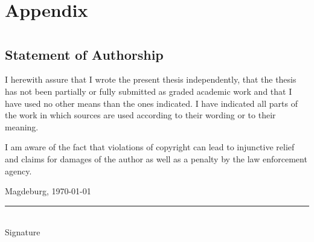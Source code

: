 \documentclass[
  12pt,
  a4paper,
  printlength,
  bibliography=totoc,
  chapterprefix,
  headings=openright,
  numbers=endperiod,
  parskip=half,
  twoside
]{scrreprt}
\begin{document}
\lipsum[2]

\printbibliography


\appendix

\chapter{Appendix}
\label{cha:appendix}

\chapter*{}

\section*{Statement of Authorship}

I herewith assure that I wrote the present thesis independently, that the thesis has not been partially or fully submitted as graded academic work and that I have used no other means than the ones indicated.
I have indicated all parts of the work in which sources are used according to their wording or to their meaning.

I am aware of the fact that violations of copyright can lead to injunctive relief and claims for damages of the author as well as a penalty by the law enforcement agency.

\bigskip

Magdeburg, \today

\bigskip
\bigskip

\rule{0.5\textwidth}{0.5pt}\\
\hspace*{0.25em}Signature
\end{document}
